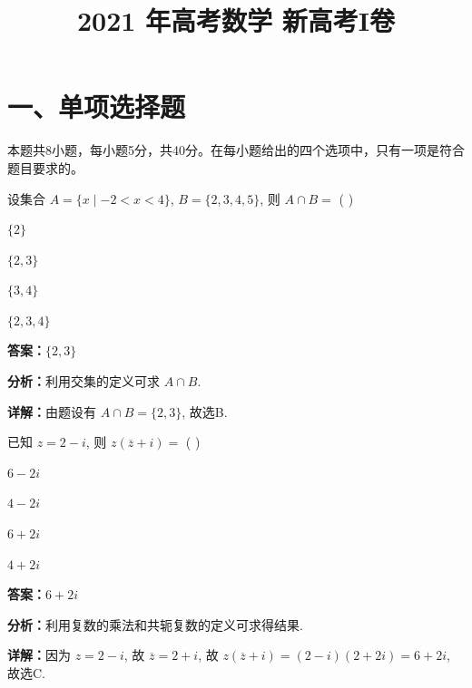 ﻿\title{2021 年高考数学 新高考I卷}
\date{}
\maketitle

\section*{一、单项选择题}
本题共8小题，每小题5分，共40分。在每小题给出的四个选项中，只有一项是符合题目要求的。

\begin{question}[points=5]
设集合 $A = \{x \mid -2 < x < 4\}$, $B = \{2,3,4,5\}$, 则 $A \cap B =$ ( )
\begin{choices}
  \item $\{2\}$
  \item $\{2,3\}$
  \item $\{3,4\}$
  \item $\{2,3,4\}$
\end{choices}
\begin{solution}
\textbf{答案：}$\{2,3\}$

\textbf{分析：}利用交集的定义可求 $A \cap B$.

\textbf{详解：}由题设有 $A \cap B = \{2,3\}$, 故选B.
\end{solution}
\end{question}

\begin{question}[points=5]
已知 $z = 2 - i$, 则 $z(\overline{z} + i) =$ ( )
\begin{choices}
  \item $6 - 2i$
  \item $4 - 2i$
  \item $6 + 2i$
  \item $4 + 2i$
\end{choices}
\begin{solution}
\textbf{答案：}$6 + 2i$

\textbf{分析：}利用复数的乘法和共轭复数的定义可求得结果.

\textbf{详解：}因为 $z = 2 - i$, 故 $\overline{z} = 2 + i$, 故 $z(\overline{z} + i) = (2 - i)(2 + 2i) = 6 + 2i$, 故选C.
\end{solution}
\end{question}

